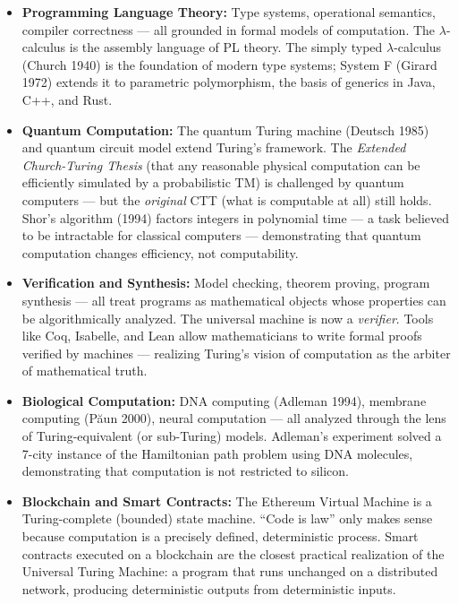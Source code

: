 \begin{itemize}
\item \textbf{Programming Language Theory:} Type systems, operational semantics, compiler correctness --- all grounded in formal models of computation. The $\lambda$-calculus is the assembly language of PL theory. The simply typed $\lambda$-calculus (Church 1940) is the foundation of modern type systems; System F (Girard 1972) extends it to parametric polymorphism, the basis of generics in Java, C++, and Rust.

\item \textbf{Quantum Computation:} The quantum Turing machine (Deutsch 1985) and quantum circuit model extend Turing's framework. The \emph{Extended Church-Turing Thesis} (that any reasonable physical computation can be efficiently simulated by a probabilistic TM) is challenged by quantum computers --- but the \emph{original} CTT (what is computable at all) still holds. Shor's algorithm (1994) factors integers in polynomial time --- a task believed to be intractable for classical computers --- demonstrating that quantum computation changes efficiency, not computability.

\item \textbf{Verification and Synthesis:} Model checking, theorem proving, program synthesis --- all treat programs as mathematical objects whose properties can be algorithmically analyzed. The universal machine is now a \emph{verifier}. Tools like Coq, Isabelle, and Lean allow mathematicians to write formal proofs verified by machines --- realizing Turing's vision of computation as the arbiter of mathematical truth.

\item \textbf{Biological Computation:} DNA computing (Adleman 1994), membrane computing (P\u{a}un 2000), neural computation --- all analyzed through the lens of Turing-equivalent (or sub-Turing) models. Adleman's experiment solved a 7-city instance of the Hamiltonian path problem using DNA molecules, demonstrating that computation is not restricted to silicon.

\item \textbf{Blockchain and Smart Contracts:} The Ethereum Virtual Machine is a Turing-complete (bounded) state machine. ``Code is law'' only makes sense because computation is a precisely defined, deterministic process. Smart contracts executed on a blockchain are the closest practical realization of the Universal Turing Machine: a program that runs unchanged on a distributed network, producing deterministic outputs from deterministic inputs.


\end{itemize}
